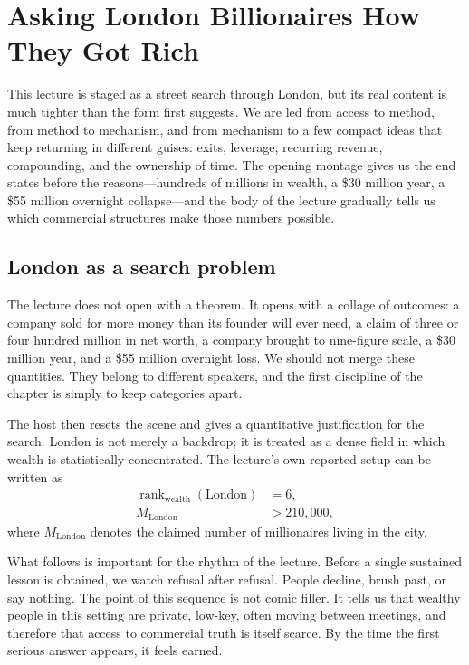 \chapter{Asking London Billionaires How They Got Rich}

This lecture is staged as a street search through London, but its real content is much tighter than the form first suggests. We are led from access to method, from method to mechanism, and from mechanism to a few compact ideas that keep returning in different guises: exits, leverage, recurring revenue, compounding, and the ownership of time. The opening montage gives us the end states before the reasons---hundreds of millions in wealth, a \$30 million year, a \$55 million overnight collapse---and the body of the lecture gradually tells us which commercial structures make those numbers possible.

\section{London as a search problem}

The lecture does not open with a theorem. It opens with a collage of outcomes: a company sold for more money than its founder will ever need, a claim of three or four hundred million in net worth, a company brought to nine-figure scale, a \$30 million year, and a \$55 million overnight loss. We should not merge these quantities. They belong to different speakers, and the first discipline of the chapter is simply to keep categories apart.

The host then resets the scene and gives a quantitative justification for the search. London is not merely a backdrop; it is treated as a dense field in which wealth is statistically concentrated. The lecture's own reported setup can be written as
\begin{align}
\operatorname{rank}_{\text{wealth}}(\text{London}) &= 6,\\
M_{\text{London}} &> 210{,}000,
\end{align}
where \(M_{\text{London}}\) denotes the claimed number of millionaires living in the city.

What follows is important for the rhythm of the lecture. Before a single sustained lesson is obtained, we watch refusal after refusal. People decline, brush past, or say nothing. The point of this sequence is not comic filler. It tells us that wealthy people in this setting are private, low-key, often moving between meetings, and therefore that access to commercial truth is itself scarce. By the time the first serious answer appears, it feels earned.

